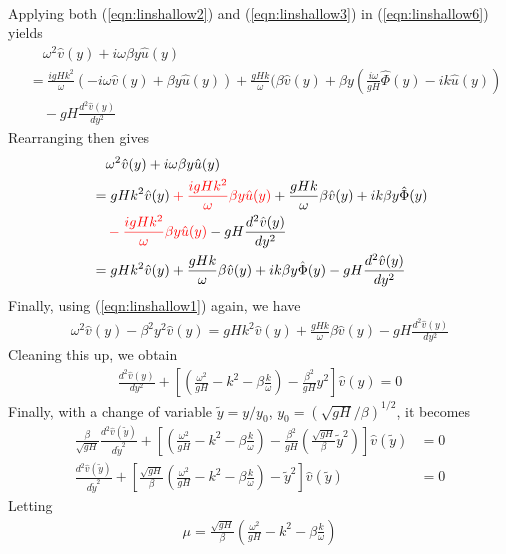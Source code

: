 \begin{solution}
\begin{align}
\end{align}
Applying both (\ref{eqn:linshallow2}) and (\ref{eqn:linshallow3}) in (\ref{eqn:linshallow6}) yields
\begin{align}
&\quad \omega^2 \hat{v}(y) + i \omega\beta y \hat{u}(y) \nonumber \\
&= \frac{i gHk^2}{\omega}(-i\omega \hat{v}(y) + \beta y \hat{u}(y)) + \frac{gHk}{\omega}(\beta\hat{v}(y) + \beta y (\frac{i \omega}{gH} \hat{\Phi}(y) - i k\hat{u}(y))  \nonumber \\
&\quad - gH \frac{d^2\hat{v}(y)}{dy^2}    
\end{align}
Rearranging then gives
\begin{align}
&\quad \omega^2 \hat{v}(y) + i \omega\beta y \hat{u}(y) \nonumber \\
&= gHk^2 \hat{v}(y) \mathcolor{red}{+ \frac{i gHk^2}{\omega} \beta y \hat{u}(y)} + \frac{gHk}{\omega}\beta\hat{v}(y) + i k \beta y \hat{\Phi}(y) \nonumber \\
&\quad \mathcolor{red}{- \frac{i gHk^2}{\omega} \beta y \hat{u}(y)} - gH \frac{d^2\hat{v}(y)}{dy^2} \nonumber \\
&= gHk^2 \hat{v}(y)  + \frac{gHk}{\omega}\beta\hat{v}(y) + i k \beta y \hat{\Phi}(y) - gH \frac{d^2\hat{v}(y)}{dy^2}
\end{align}
Finally, using (\ref{eqn:linshallow1}) again, we have
\begin{align}
\omega^2 \hat{v}(y) - \beta^2 y^2 \hat{v}(y) = gHk^2 \hat{v}(y)  + \frac{gHk}{\omega}\beta\hat{v}(y) - gH \frac{d^2\hat{v}(y)}{dy^2}    
\end{align}
Cleaning this up, we obtain
\begin{align}
\frac{d^2\hat{v}(y)}{dy^2} + [(\frac{\omega^2}{gH} - k^2 - \beta\frac{k}{\omega}) - \frac{\beta^2}{gH}y^2]\hat{v}(y) = 0
\end{align}
Finally, with a change of variable $\tilde{y} = y/y_0$, $y_0 = (\sqrt{gH}/\beta)^{1/2}$, it becomes
\begin{align}
\frac{\beta}{\sqrt{gH}} \frac{d^2\hat{v}(\tilde{y})}{d\tilde{y}^2} + [(\frac{\omega^2}{gH} - k^2 - \beta\frac{k}{\omega}) - \frac{\beta^2}{gH}(\frac{\sqrt{gH}}{\beta}\tilde{y}^2)]\hat{v}(\tilde{y}) &= 0 \nonumber \\
\frac{d^2\hat{v}(\tilde{y})}{d\tilde{y}^2} + [\frac{\sqrt{gH}}{\beta}(\frac{\omega^2}{gH} - k^2 - \beta\frac{k}{\omega}) - \tilde{y}^2]\hat{v}(\tilde{y}) &= 0   
\end{align}
Letting 
\begin{align}
\mu = \frac{\sqrt{gH}}{\beta}(\frac{\omega^2}{gH} - k^2 - \beta\frac{k}{\omega})

\end{align}
\end{solution}
